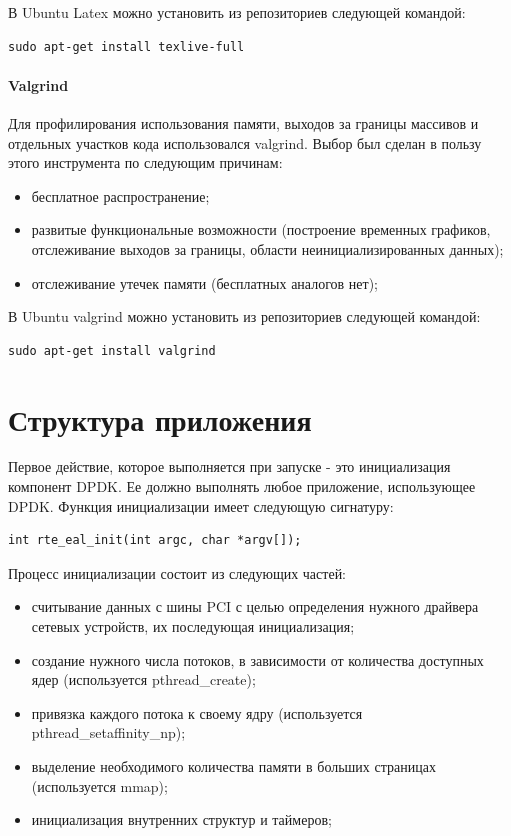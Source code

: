 В Ubuntu Latex можно установить из репозиториев следующей командой:
\begin{lstlisting}
sudo apt-get install texlive-full
\end{lstlisting}

\paragraph{Valgrind}

Для профилирования использования памяти, выходов за границы массивов и отдельных участков кода использовался valgrind. Выбор был сделан в пользу этого инструмента по следующим причинам:
\begin{itemize}
\item бесплатное распространение;
\item развитые функциональные возможности (построение временных графиков, отслеживание выходов за границы, области неинициализированных данных);
\item отслеживание утечек памяти (бесплатных аналогов нет);
\end{itemize}

В Ubuntu valgrind можно установить из репозиториев следующей командой:
\begin{lstlisting}
sudo apt-get install valgrind
\end{lstlisting}


\section{Структура приложения}
Первое действие, которое выполняется при запуске - это инициализация компонент DPDK. Ее должно выполнять любое приложение, использующее DPDK. Функция инициализации имеет следующую сигнатуру:
\begin{lstlisting}
int rte_eal_init(int argc, char *argv[]);
\end{lstlisting}

Процесс инициализации состоит из следующих частей:
\begin{itemize}
\item считывание данных с шины PCI с целью определения нужного драйвера сетевых устройств, их последующая инициализация;
\item создание нужного числа потоков, в зависимости от количества доступных ядер (используется pthread\_create);
\item привязка каждого потока к своему ядру (используется pthread\_setaffinity\_np);
\item выделение необходимого количества памяти в больших страницах (используется mmap);
\item инициализация внутренних структур и таймеров;
\end{itemize}

